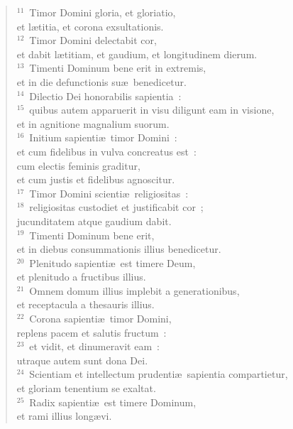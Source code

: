 \begin{flushleft}\begin{verse}${}^{11}$~Timor Domini gloria, et gloriatio,\\ et l\ae titia, et corona exsultationis.\\
${}^{12}$~Timor Domini delectabit cor,\\ et dabit l\ae titiam, et gaudium, et longitudinem dierum.\\
${}^{13}$~Timenti Dominum bene erit in extremis,\\ et in die defunctionis su\ae\ benedicetur.\\
${}^{14}$~Dilectio Dei honorabilis sapientia~:\\
${}^{15}$~quibus autem apparuerit in visu diligunt eam in visione,\\ et in agnitione magnalium suorum.\\
${}^{16}$~Initium sapienti\ae\ timor Domini~:\\ et cum fidelibus in vulva concreatus est~:\\ cum electis feminis graditur,\\ et cum justis et fidelibus agnoscitur.\\
${}^{17}$~Timor Domini scienti\ae\ religiositas~:\\
${}^{18}$~religiositas custodiet et justificabit cor~;\\ jucunditatem atque gaudium dabit.\\
${}^{19}$~Timenti Dominum bene erit,\\ et in diebus consummationis illius benedicetur.\\
${}^{20}$~Plenitudo sapienti\ae\ est timere Deum,\\ et plenitudo a fructibus illius.\\
${}^{21}$~Omnem domum illius implebit a generationibus,\\ et receptacula a thesauris illius.\\
${}^{22}$~Corona sapienti\ae\ timor Domini,\\ replens pacem et salutis fructum~:\\
${}^{23}$~et vidit, et dinumeravit eam~:\\ utraque autem sunt dona Dei.\\
${}^{24}$~Scientiam et intellectum prudenti\ae\ sapientia compartietur,\\ et gloriam tenentium se exaltat.\\
${}^{25}$~Radix sapienti\ae\ est timere Dominum,\\ et rami illius long\ae vi.\\

\end{verse}
\end{flushleft}
